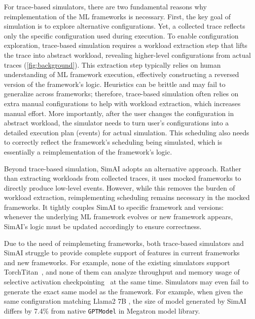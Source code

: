 For trace-based simulators, there are two fundamental reasons why reimplementation of the ML frameworks is necessary.
First, the key goal of simulation is to explore alternative configurations. Yet, a collected trace reflects only the specific configuration used during execution. To enable configuration exploration, trace-based simulation requires a workload extraction step that lifts the trace into abstract workload, revealing higher-level configurations from actual traces (\autoref{fig:background}). This extraction step typically relies on human understanding of ML framework execution, effectively constructing a reversed version of the framework’s logic. Heuristics can be brittle and may fail to generalize across frameworks; therefore, trace-based simulation often relies on extra manual configurations to help with workload extraction, which increases manual effort.
More importantly, after the user changes the configuration in abstract workload, the simulator needs to turn user's configurations into a detailed execution plan (events) for actual simulation. This scheduling also needs to correctly reflect the framework's scheduling being simulated, which is essentially a reimplementation of the framework's logic.

Beyond trace-based simulation, SimAI \cite{wang2025simai} adopts an alternative approach. Rather than extracting workloads from collected traces, it uses mocked frameworks to directly produce low-level events. However, while this removes the burden of workload extraction, reimplementing scheduling remains necessary in the mocked frameworks. It tightly couples SimAI to specific framework and versions: whenever the underlying ML framework evolves or new framework appears, SimAI’s logic must be updated accordingly to ensure correctness. 

Due to the need of reimplemeting frameworks, both trace-based simulators and SimAI struggle to provide complete support of features in current frameworks and new frameworks. For example, none of the existing simulators support TorchTitan~\cite{liang2025torchtitan}, and none of them can analyze throughput and memory usage of selective activation checkpointing~\cite{korthikanti2023ac,liang2025torchtitan} at the same time. Simulators may even fail to generate the exact same model as the framework. For example, when given the same configuration matching Llama2 7B \cite{touvron2023llama}, the size of model generated by SimAI differs by 7.4\% from native \texttt{GPTModel} in Megatron \cite{shoeybi2019megatron} model library.


